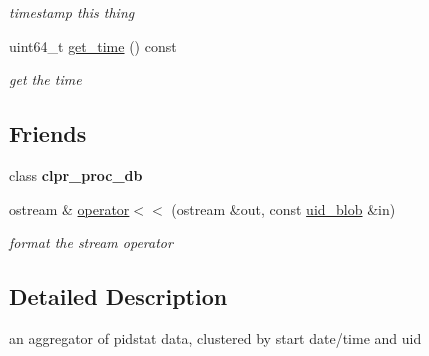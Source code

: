 \begin{DoxyCompactItemize}
\begin{DoxyCompactList}\small\item\em timestamp this thing \end{DoxyCompactList}\item 
\hypertarget{classclpr__d_1_1uid__blob_a3c3372c909e313db27486d8db507af1c}{uint64\-\_\-t \hyperlink{classclpr__d_1_1uid__blob_a3c3372c909e313db27486d8db507af1c}{get\-\_\-time} () const }\label{classclpr__d_1_1uid__blob_a3c3372c909e313db27486d8db507af1c}

\begin{DoxyCompactList}\small\item\em get the time \end{DoxyCompactList}\end{DoxyCompactItemize}
\subsection*{\-Friends}
\begin{DoxyCompactItemize}
\item 
\hypertarget{classclpr__d_1_1uid__blob_ad6499d69c3cae76f9f721a7af2680e28}{class {\bfseries clpr\-\_\-proc\-\_\-db}}\label{classclpr__d_1_1uid__blob_ad6499d69c3cae76f9f721a7af2680e28}

\item 
\hypertarget{classclpr__d_1_1uid__blob_ad764a22525c0dba0e41099a7a89512e1}{ostream \& \hyperlink{classclpr__d_1_1uid__blob_ad764a22525c0dba0e41099a7a89512e1}{operator$<$$<$} (ostream \&out, const \hyperlink{classclpr__d_1_1uid__blob}{uid\-\_\-blob} \&in)}\label{classclpr__d_1_1uid__blob_ad764a22525c0dba0e41099a7a89512e1}

\begin{DoxyCompactList}\small\item\em format the stream operator \end{DoxyCompactList}\end{DoxyCompactItemize}


\subsection{\-Detailed \-Description}
an aggregator of pidstat data, clustered by start date/time and uid 

